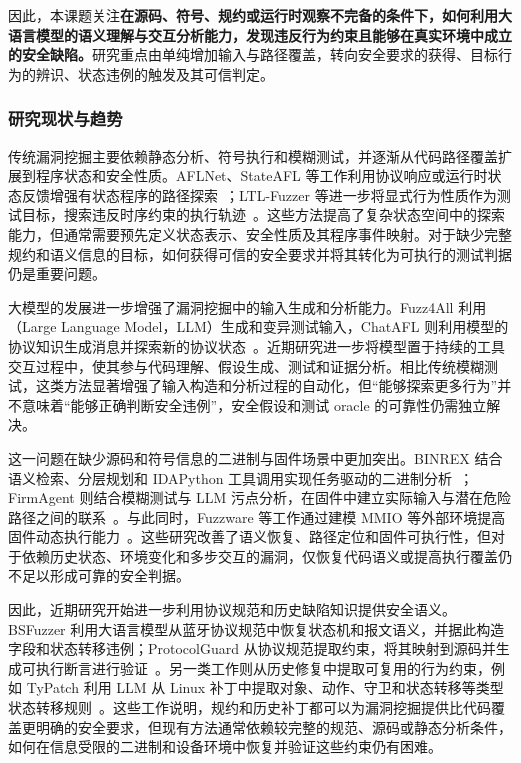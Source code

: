 因此，本课题关注\textbf{在源码、符号、规约或运行时观察不完备的条件下，如何利用大语言模型的语义理解与交互分析能力，发现违反行为约束且能够在真实环境中成立的安全缺陷。}研究重点由单纯增加输入与路径覆盖，转向安全要求的获得、目标行为的辨识、状态违例的触发及其可信判定。

\subsubsection{研究现状与趋势}

传统漏洞挖掘主要依赖静态分析、符号执行和模糊测试，并逐渐从代码路径覆盖扩展到程序状态和安全性质。AFLNet、StateAFL 等工作利用协议响应或运行时状态反馈增强有状态程序的路径探索~\cite{aflnet,stateafl}；LTL-Fuzzer 等进一步将显式行为性质作为测试目标，搜索违反时序约束的执行轨迹~\cite{ltlfuzz}。这些方法提高了复杂状态空间中的探索能力，但通常需要预先定义状态表示、安全性质及其程序事件映射。对于缺少完整规约和语义信息的目标，如何获得可信的安全要求并将其转化为可执行的测试判据仍是重要问题。

大模型的发展进一步增强了漏洞挖掘中的输入生成和分析能力。Fuzz4All 利用 （Large Language Model，LLM）生成和变异测试输入，ChatAFL 则利用模型的协议知识生成消息并探索新的协议状态~\cite{fuzz4all,chatafl}。近期研究进一步将模型置于持续的工具交互过程中，使其参与代码理解、假设生成、测试和证据分析。相比传统模糊测试，这类方法显著增强了输入构造和分析过程的自动化，但“能够探索更多行为”并不意味着“能够正确判断安全违例”，安全假设和测试 oracle 的可靠性仍需独立解决。

这一问题在缺少源码和符号信息的二进制与固件场景中更加突出。BINREX 结合语义检索、分层规划和 IDAPython 工具调用实现任务驱动的二进制分析~\cite{binrex}；FirmAgent 则结合模糊测试与 LLM 污点分析，在固件中建立实际输入与潜在危险路径之间的联系~\cite{firmagent}。与此同时，Fuzzware 等工作通过建模 MMIO 等外部环境提高固件动态执行能力~\cite{fuzzware}。这些研究改善了语义恢复、路径定位和固件可执行性，但对于依赖历史状态、环境变化和多步交互的漏洞，仅恢复代码语义或提高执行覆盖仍不足以形成可靠的安全判据。

因此，近期研究开始进一步利用协议规范和历史缺陷知识提供安全语义。BSFuzzer 利用大语言模型从蓝牙协议规范中恢复状态机和报文语义，并据此构造字段和状态转移违例；ProtocolGuard 从协议规范提取约束，将其映射到源码并生成可执行断言进行验证~\cite{bsfuzzer,protocolguard}。另一类工作则从历史修复中提取可复用的行为约束，例如 TyPatch 利用 LLM 从 Linux 补丁中提取对象、动作、守卫和状态转移等类型状态转移规则~\cite{typatch}。这些工作说明，规约和历史补丁都可以为漏洞挖掘提供比代码覆盖更明确的安全要求，但现有方法通常依赖较完整的规范、源码或静态分析条件，如何在信息受限的二进制和设备环境中恢复并验证这些约束仍有困难。

